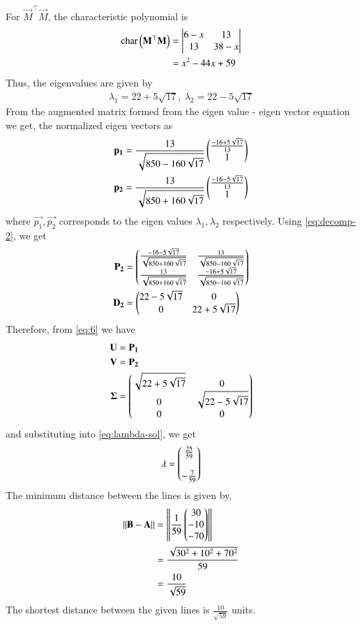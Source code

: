 \documentclass[journal,12pt,twocolumn]{IEEEtran}
\begin{document}
\begin{enumerate}
\begin{enumerate}
For $\vec{M}^\top\vec{M}$, the characteristic polynomial is
\begin{align}
    \text{char}\left(\mathbf{M}^\top\mathbf{M}\right) &= \begin{vmatrix}6-x&13\\13&38-x\end{vmatrix} \\&= x^2-44x+59
    \label{eq:char-1}
\end{align}
Thus, the eigenvalues are given by
\begin{align}
    \lambda_1 = 22+5\sqrt{17},\ \lambda_2 = 22-5\sqrt{17}
\end{align}
From the augmented matrix formed from the eigen value - eigen vector equation we get, the normalized eigen vectors as
\begin{align}
\mathbf{p_1} &= \frac{13}{\sqrt{850-160\sqrt{17}}}\begin{pmatrix}\frac{-16+5\sqrt{17}}{13}\\1\end{pmatrix}\\
\mathbf{p_2} &= \frac{13}{\sqrt{850+160\sqrt{17}}} \begin{pmatrix}\frac{-16-5\sqrt{17}}{13}\\1\end{pmatrix}
\end{align}
where $\vec{p_1},\vec{p_2}$ corresponds to the  eigen values $\lambda_1, \lambda_2$ respectively. Using \eqref{eq:decomp-2}, we get
\begin{align}
    \mathbf{P_2} &= \begin{pmatrix}\frac{-16-5\sqrt{17}}{\sqrt{850+160\sqrt{17}}}&\frac{13}{\sqrt{850-160\sqrt{17}}}\\\frac{13}{\sqrt{850+160\sqrt{17}}}&\frac{-16+5\sqrt{17}}{\sqrt{850-160\sqrt{17}}}\end{pmatrix}
     \label{eq:eig-params-2(a)}\\ 
    \mathbf{D_2} &= \begin{pmatrix}22-5\sqrt{17}&0\\0&22+5\sqrt{17}\end{pmatrix}
    \label{eq:eig-params-2(b)}
\end{align}
Therefore, from \eqref{eq:6} we have
\begin{align}
    \mathbf{U} &= \mathbf{P_1} \\ 
    \mathbf{V} &= \mathbf{P_2} \\
    \mathbf{\Sigma} &= \begin{pmatrix}\sqrt{22+5\sqrt{17}}&0\\0&\sqrt{22-5\sqrt{17}}\\0&0\end{pmatrix}
    \label{eq:svd-params}
\end{align}
and substituting into \eqref{eq:lambda-sol}, we get
\begin{align}
    \mathbf{\lambda} =  \begin{pmatrix}\frac{25}{59}\\\\-\frac{7}{59}\end{pmatrix}
\end{align}
The minimum distance between the lines is given by,
\begin{align}
\left\lVert\mathbf{B}-\mathbf{A}\right\rVert &= \left\lVert\frac{1}{59}\begin{pmatrix}30\\-10\\-70\end{pmatrix}\right\rVert\\
&= \frac{\sqrt{30^2+10^2+70^2}}{59}\\
&= \frac{10}{\sqrt{59}}
\end{align}
The shortest distance between the given lines is $\frac{10}{\sqrt{59}}$ units.


\end{enumerate}
\end{enumerate}
\end{document}
